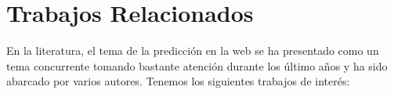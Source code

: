 \section{Trabajos Relacionados}

En la literatura, el tema de la predicción en la web se ha presentado como un tema concurrente tomando bastante atención durante los último años y ha sido abarcado por 
varios autores. Tenemos los siguientes trabajos de interés:







